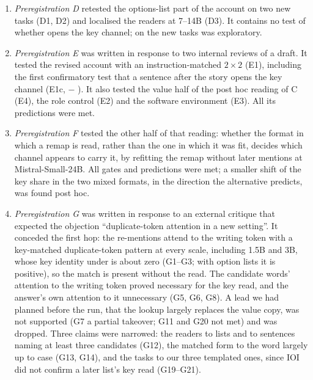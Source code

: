 \begin{enumerate}
  \item \emph{Preregistration D} retested the options-list part of the account on two new tasks (D1, D2) and localised the readers at 7--14B (D3). It contains no test of whether \fmtPost{} opens the key channel; \fmtPost{} on the new tasks was exploratory.
  \item \emph{Preregistration E} was written in response to two internal reviews of a draft. It tested the revised account with an instruction-matched $2{\times}2$ (E1), including the first confirmatory test that a sentence after the story opens the key channel (E1c, \fmtPost{} $-$ \fmtSentB{}). It also tested the value half of the post hoc reading of C (E4), the role control (E2) and the software environment (E3). All its predictions were met.
  \item \emph{Preregistration F} tested the other half of that reading: whether the format in which a remap is read, rather than the one in which it was fit, decides which channel appears to carry it, by refitting the remap without later mentions at Mistral-Small-24B. All gates and predictions were met; a smaller shift of the key share in the two mixed formats, in the direction the alternative predicts, was found post hoc.
  \item \emph{Preregistration G} was written in response to an external critique that expected the objection ``duplicate-token attention in a new setting''. It conceded the first hop: the re-mentions attend to the writing token with a key-matched duplicate-token pattern at every scale, including 1.5B and 3B, whose key identity under \fmtPost{} is about zero (G1--G3; with option lists it is positive), so the match is present without the read. The candidate words' attention to the writing token proved necessary for the key read, and the answer's own attention to it unnecessary (G5, G6, G8). A lead we had planned before the run, that the lookup largely replaces the value copy, was not supported (G7 a partial takeover; G11 and G20 not met) and was dropped. Three claims were narrowed: the readers to lists and to sentences naming at least three candidates (G12), the matched form to the word largely up to case (G13, G14), and the tasks to our three templated ones, since IOI did not confirm a later list's key read (G19--G21).

\end{enumerate}
